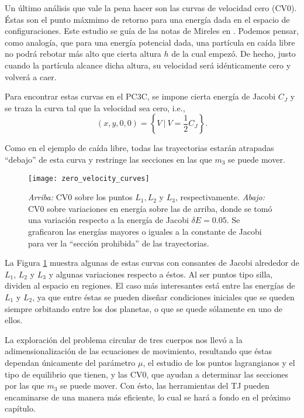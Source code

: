Un último análisis que vale la pena hacer son las curvas de velocidad cero (CV0). Éstas son el punto máxmimo de retorno para una energía dada en el espacio de configuraciones. Este estudio se guía de las notas de Mireles en \cite{MirelesJames2006}. Podemos pensar, como analogía, que para una energía potencial dada, una partícula en caída libre no podrá rebotar más alto que cierta altura $h$ de la cual empezó. De hecho, justo cuando la partícula alcance dicha altura, su velocidad será idénticamente cero y volverá a caer. 

Para encontrar estas curvas en el PC3C, se impone cierta energía de Jacobi $C_J$ y se traza la curva tal que la velocidad sea cero, i.e.,
\begin{equation*}
 (x,y,0,0) = \left\lbrace V \ | \  V = \frac{1}{2}C_J \right\rbrace.
\end{equation*}

Como en el ejemplo de caída libre, todas las trayectorias estarán atrapadas ``debajo'' de esta curva y restringe las secciones en las que $m_3$ se puede mover. 

\begin{figure}[h!]
 \centering
 \texttt{[image: zero\_velocity\_curves]}
 \caption{\textit{Arriba:} CV0 sobre los puntos $L_1, L_2$ y $L_3$, respectivamente. \textit{Abajo:} CV0 sobre variaciones en energía sobre las de arriba, donde se tomó una variación respecto a la energía de Jacobi $\delta E = 0.05$. Se graficaron las energías mayores o iguales a la constante de Jacobi para ver la ``sección prohibida'' de las trayectorias. }
 \label{fig:zero_velocity_curves}
\end{figure}

La Figura \ref{fig:zero_velocity_curves} muestra algunas de estas curvas con consantes de Jacobi alrededor de $L_1$, $L_2$ y $L_3$ y algunas variaciones respecto a éstos. Al ser puntos tipo silla, dividen al espacio en regiones. El caso más interesantes está entre las energías de $L_1$ y $L_2$, ya que entre éstas se pueden diseñar condiciones iniciales que se queden siempre orbitando entre los dos planetas, o que se quede sólamente en uno de ellos.

La exploración del problema circular de tres cuerpos nos llevó a la adimensionalización de las ecuaciones de movimiento, resultando que éstas dependan únicamente del parámetro $\mu$, el estudio de los puntos lagrangianos y el tipo de equilibrio que tienen, y las CV0, que ayudan a determinar las secciones por las que $m_3$ se puede mover. Con ésto, las herramientas del TJ pueden encaminarse de una manera más eficiente, lo cual se hará a fondo en el próximo capítulo.